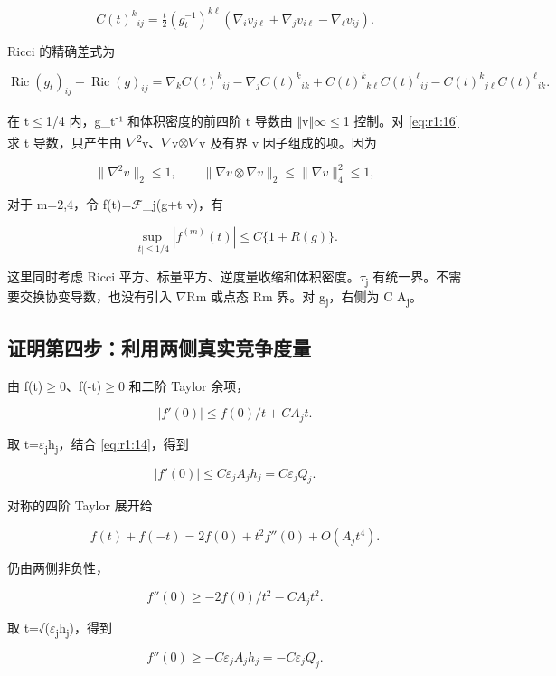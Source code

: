 \documentclass[UTF8,11pt,openany,oneside,fontset=none]{ctexbook}
\begin{document}
\[
C(t)^k{}_{ij}
=\tfrac t2(g_t^{-1})^{k\ell}
(\nabla_i v_{j\ell}+\nabla_j v_{i\ell}-\nabla_\ell v_{ij}).
\tag{1.15}\label{eq:r1:15}
\]

Ricci 的精确差式为

\[
\operatorname{Ric}(g_t)_{ij}-\operatorname{Ric}(g)_{ij}
=\nabla_kC(t)^k{}_{ij}-\nabla_jC(t)^k{}_{ik}
+C(t)^k{}_{k\ell}C(t)^\ell{}_{ij}
-C(t)^k{}_{j\ell}C(t)^\ell{}_{ik}.
\tag{1.16}\label{eq:r1:16}
\]

在 \textbar t\textbar\(\le\)1/4 内，g\_t\textsuperscript{-}¹ 和体积密度的前四阶 t 导数由 \(\Vert\)v\(\Vert\)\(\infty\)\(\le\)1 控制。对 \eqref{eq:r1:16} 求 t 导数，只产生由 \(\nabla\)\textsuperscript{2}v、\(\nabla\)v\(\otimes\)\(\nabla\)v 及有界 v 因子组成的项。因为

\[
\|\nabla^2v\|_2\le1,\qquad
\|\nabla v\otimes\nabla v\|_2\le\|\nabla v\|_4^2\le1,
\]

对于 m=2,4，令 f(t)=\(\mathscr F\)\_j(g+t v)，有

\[
\sup_{|t|\le1/4}|f^{(m)}(t)|
\le C\{1+R(g)\}.
\tag{1.17}\label{eq:r1:17}
\]

这里同时考虑 Ricci 平方、标量平方、逆度量收缩和体积密度。\textbar \(\tau\)\textsubscript{j}\textbar{} 有统一界。不需要交换协变导数，也没有引入 \(\nabla\)Rm 或点态 Rm 界。对 g\textsubscript{j}，右侧为 C A\textsubscript{j}。

\subsection{证明第四步：利用两侧真实竞争度量}\label{ch1:ux8bc1ux660eux7b2cux56dbux6b65ux5229ux7528ux4e24ux4fa7ux771fux5b9eux7adeux4e89ux5ea6ux91cf}

由 f(t)\(\ge\)0、f(-t)\(\ge\)0 和二阶 Taylor 余项，

\[
|f'(0)|\le f(0)/t+C A_j t.
\]

取 t=\(\varepsilon\)\textsubscript{j}h\textsubscript{j}，结合 \eqref{eq:r1:14}，得到

\[
|f'(0)|\le C\varepsilon_jA_jh_j=C\varepsilon_jQ_j.
\]

对称的四阶 Taylor 展开给

\[
f(t)+f(-t)=2f(0)+t^2f''(0)+O(A_jt^4).
\]

仍由两侧非负性，

\[
f''(0)\ge-2f(0)/t^2-C A_j t^2.
\]

取 t=√(\(\varepsilon\)\textsubscript{j}h\textsubscript{j})，得到

\[
f''(0)\ge-C\varepsilon_jA_jh_j=-C\varepsilon_jQ_j.
\]
\end{document}
